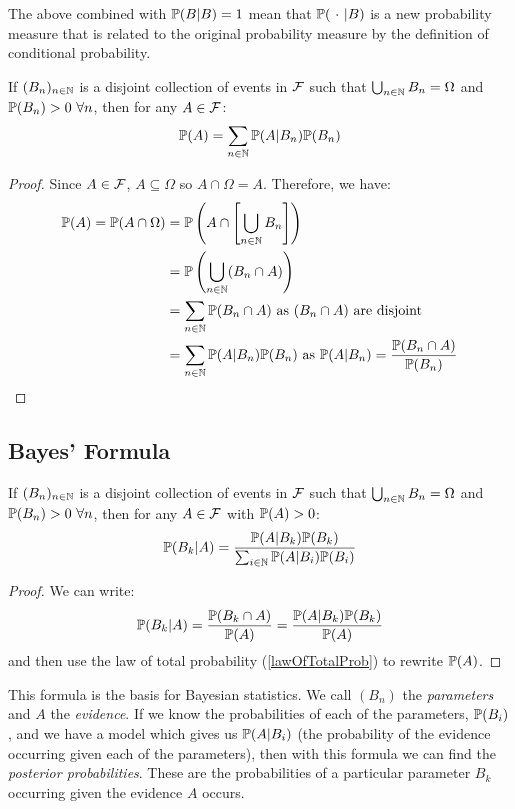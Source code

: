 \documentclass[../main.tex]{subfiles}
\begin{document}
\begin{remark}
  The above combined with $\P(B \vert B) = 1$ mean that $\P(\ \cdot\ \vert B)$ is a new probability measure that is related to the original probability measure by the definition of conditional probability.
\end{remark}
\begin{proposition}
  If $(B_n)_{n \in \N}$ is a disjoint collection of events in $\salg$ such that $\bigcup_{n \in \N} B_n = \Omega$ and $\P(B_n) > 0\ \forall n$, then for any $A \in \salg$:
  \[
    \P(A) = \sum_{n \in \N} \P(A \vert B_n)\P(B_n)
  \]
  \label{lawOfTotalProb}
\end{proposition}
\begin{proof}
  Since $A \in \salg$, $A \subseteq \Omega$ so $A \cap \Omega = A$.
  Therefore, we have:
  \begin{align*}
    \P(A) = \P(A \cap \Omega) &= \P\left(A \cap \left[\bigcup_{n \in \N} B_n\right]\right) \\
                              &= \P\left(\bigcup_{n \in \N} (B_n \cap A)\right) \\
                              &= \sum_{n \in \N} \P(B_n \cap A) \text{ as $(B_n \cap A)$ are disjoint}\\
                              &= \sum_{n \in \N} \P(A \vert B_n) \P(B_n) \text{ as $\P(A \vert B_n) = \frac{\P(B_n \cap A)}{\P(B_n)}$}
  \end{align*}
\end{proof}
\subsection{Bayes' Formula}
\begin{proposition}
  If $(B_n)_{n \in \N}$ is a disjoint collection of events in $\salg$ such that $\bigcup_{n \in \N} B_n = \Omega$ and $\P(B_n) > 0\ \forall n$, then for any $A \in \salg$ with $\P(A) > 0$:
  \[
    \P(B_k \vert A) = \frac{\P(A \vert B_k)\P(B_k)}{\sum_{i \in \N} \P(A \vert B_i) \P(B_i)}
  \]
\end{proposition}
\begin{proof}
  We can write:
  \[
    \P(B_k \vert A) = \frac{\P(B_k \cap A)}{\P(A)} = \frac{\P(A \vert B_k)\P(B_k)}{\P(A)}
  \]
  and then use the law of total probability (\cref{lawOfTotalProb}) to rewrite $\P(A)$.
\end{proof}
This formula is the basis for Bayesian statistics.
We call $(B_n)$ the \textit{parameters} and $A$ the \textit{evidence}.
If we know the probabilities of each of the parameters, $\P(B_i)$, and we have a model which gives us $\P(A \vert B_i)$ (the probability of the evidence occurring given each of the parameters), then with this formula we can find the \textit{posterior probabilities}.
These are the probabilities of a particular parameter $B_k$ occurring given the evidence $A$ occurs.
\end{document}
